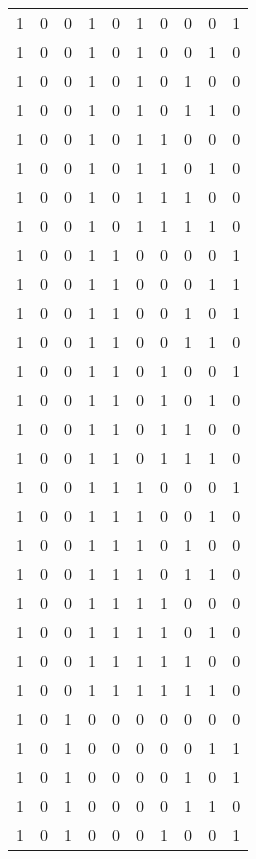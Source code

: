 \begin{longtable}[c]{rrrrrrrrrr}
        1 & 0 & 0 & 1 & 0 & 1 & 0 & 0 & 0 & 1 \\
        1 & 0 & 0 & 1 & 0 & 1 & 0 & 0 & 1 & 0 \\
        1 & 0 & 0 & 1 & 0 & 1 & 0 & 1 & 0 & 0 \\
        1 & 0 & 0 & 1 & 0 & 1 & 0 & 1 & 1 & 0 \\
        1 & 0 & 0 & 1 & 0 & 1 & 1 & 0 & 0 & 0 \\
        1 & 0 & 0 & 1 & 0 & 1 & 1 & 0 & 1 & 0 \\
        1 & 0 & 0 & 1 & 0 & 1 & 1 & 1 & 0 & 0 \\
        1 & 0 & 0 & 1 & 0 & 1 & 1 & 1 & 1 & 0 \\
        1 & 0 & 0 & 1 & 1 & 0 & 0 & 0 & 0 & 1 \\
        1 & 0 & 0 & 1 & 1 & 0 & 0 & 0 & 1 & 1 \\
        1 & 0 & 0 & 1 & 1 & 0 & 0 & 1 & 0 & 1 \\
        1 & 0 & 0 & 1 & 1 & 0 & 0 & 1 & 1 & 0 \\
        1 & 0 & 0 & 1 & 1 & 0 & 1 & 0 & 0 & 1 \\
        1 & 0 & 0 & 1 & 1 & 0 & 1 & 0 & 1 & 0 \\
        1 & 0 & 0 & 1 & 1 & 0 & 1 & 1 & 0 & 0 \\
        1 & 0 & 0 & 1 & 1 & 0 & 1 & 1 & 1 & 0 \\
        1 & 0 & 0 & 1 & 1 & 1 & 0 & 0 & 0 & 1 \\
        1 & 0 & 0 & 1 & 1 & 1 & 0 & 0 & 1 & 0 \\
        1 & 0 & 0 & 1 & 1 & 1 & 0 & 1 & 0 & 0 \\
        1 & 0 & 0 & 1 & 1 & 1 & 0 & 1 & 1 & 0 \\
        1 & 0 & 0 & 1 & 1 & 1 & 1 & 0 & 0 & 0 \\
        1 & 0 & 0 & 1 & 1 & 1 & 1 & 0 & 1 & 0 \\
        1 & 0 & 0 & 1 & 1 & 1 & 1 & 1 & 0 & 0 \\
        1 & 0 & 0 & 1 & 1 & 1 & 1 & 1 & 1 & 0 \\
        1 & 0 & 1 & 0 & 0 & 0 & 0 & 0 & 0 & 0 \\
        1 & 0 & 1 & 0 & 0 & 0 & 0 & 0 & 1 & 1 \\
        1 & 0 & 1 & 0 & 0 & 0 & 0 & 1 & 0 & 1 \\
        1 & 0 & 1 & 0 & 0 & 0 & 0 & 1 & 1 & 0 \\
        1 & 0 & 1 & 0 & 0 & 0 & 1 & 0 & 0 & 1 \\

\end{longtable}
